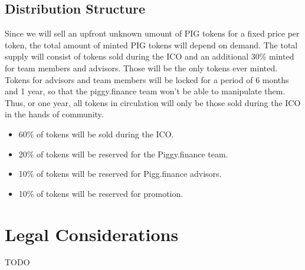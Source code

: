 \documentclass[english]{article}
\begin{document}
\subsection{Distribution Structure}
Since we will sell an upfront unknown umount of PIG tokens for a fixed price per token, the total amount of minted PIG tokens will depend on demand. The total supply will consist of tokens sold during the ICO and an additional 30\% minted for team members and advisors. Those will be the only tokens ever minted. Tokens for advisors and team members will be locked for a period of 6 months and 1 year, so that the piggy.finance team won't be able to manipulate them. Thus, or one year, all tokens in circulation will only be those sold during the ICO in the hands of community.

\begin{itemize}
  \item 60\% of tokens will be sold during the ICO.
  \item 20\% of tokens will be reserved for the Piggy.finance team.
  \item 10\% of tokens will be reserved for Pigg.finance advisors.
  \item 10\% of tokens will be reserved for promotion.
\end{itemize}

\section{Legal Considerations}
TODO

\printbibliography

\newpage
\end{document}
